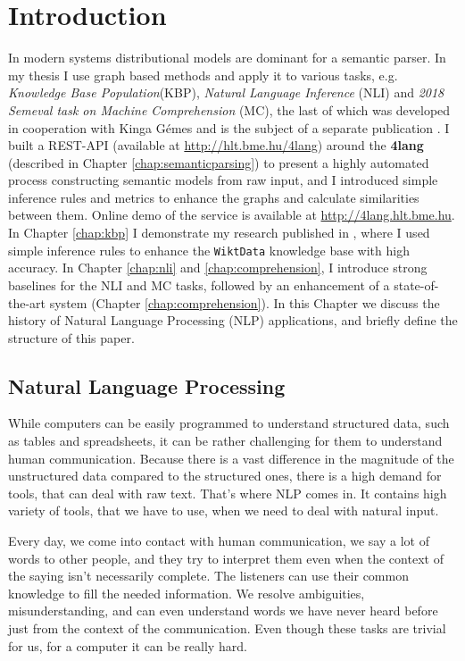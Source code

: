 \chapter{Introduction}
\label{chap:Introdu}
In modern systems distributional models are dominant for a semantic parser. In my thesis I use graph based methods and 
apply it to various tasks, e.g. \textit{Knowledge Base Population}(KBP), \textit{Natural Language Inference} (NLI) and \textit{2018 Semeval task on Machine Comprehension} (MC), the last of which was developed in cooperation with Kinga G\'emes and is the subject of a separate publication \cite{Kovacs:2018b}.
I built a REST-API (available at \url{http://hlt.bme.hu/4lang}) 
around the \textbf{4lang}\cite{Recski:2016} (described in Chapter \ref{chap:semanticparsing}) 
to present a highly automated process constructing semantic models from raw input, and I introduced simple inference rules and metrics to enhance the graphs and calculate similarities between them.
Online demo of the service is available at \url{http://4lang.hlt.bme.hu}. 
In Chapter \ref{chap:kbp} I demonstrate my research published in \cite{Kovacs:2018}, where I used simple inference rules to enhance the \texttt{WiktData} knowledge base with high accuracy.  
In Chapter \ref{chap:nli} and \ref{chap:comprehension}, I introduce strong baselines for the NLI and MC tasks, 
followed by an enhancement of a state-of-the-art system \cite{Wang:2018} (Chapter \ref{chap:comprehension}). 
In this Chapter we discuss the history of Natural Language Processing (NLP) applications, 
and briefly define the structure of this paper.
\section{Natural Language Processing}
While computers can be easily programmed to understand structured data, such as tables and spreadsheets, it can be rather challenging for them
to understand human communication. Because there is a vast difference in the magnitude of the unstructured data compared to the structured ones, there is a high demand
for tools, that can deal with raw text. That's where NLP comes in. It contains high variety of tools, that we have to use, when we need to deal with natural input.

Every day, we come into contact with human communication, we say a lot of words to other people, and they try to interpret them even when the context of the saying 
isn't necessarily complete. The listeners can use their common knowledge to fill the needed information. We resolve ambiguities, misunderstanding, and can even understand words 
we have never heard before just from the context of the communication.
Even though these tasks are trivial for us, for a computer it can be really hard.

